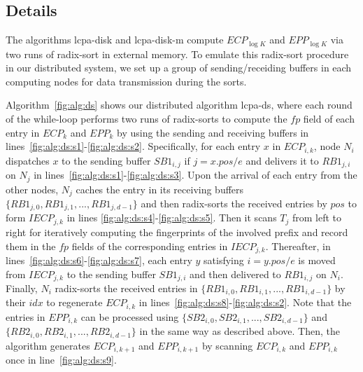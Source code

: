 \documentclass[10pt,journal,letterpaper,compsoc]{IEEEtran}
\begin{document}
\begin{CJK*}{GBK}{song}
\subsection{Details}

The algorithms lcpa-disk and lcpa-disk-m compute $ECP_{\log K}$ and $EPP_{\log K}$ via two runs of radix-sort in external memory. To emulate this radix-sort procedure in our distributed system, we set up a group of sending/receiding buffers in each computing nodes for data transmission during the sorts.

Algorithm~\ref{fig:alg:ds} shows our distributed algorithm lcpa-ds, where each round of the while-loop performs two runs of radix-sorts to compute the $fp$ field of each entry in $ECP_k$ and $EPP_k$ by using the sending and receiving buffers in lines~\ref{fig:alg:ds:s1}-\ref{fig:alg:ds:s2}. Specifically, for each entry $x$ in $ECP_{i,k}$, node $N_i$ dispatches $x$ to the sending buffer $SB1_{i,j}$ if $j = x.pos / e$ and delivers it to $RB1_{j,i}$ on $N_j$ in lines~\ref{fig:alg:ds:s1}-\ref{fig:alg:ds:s3}. Upon the arrival of each entry from the other nodes, $N_j$ caches the entry in its receiving buffers $\{RB1_{j,0},RB1_{j,1},...,RB1_{j,d-1}\}$ and then radix-sorts the received entries by $pos$ to form $IECP_{j,k}$ in lines \ref{fig:alg:ds:s4}-\ref{fig:alg:ds:s5}. Then it scans $T_j$ from left to right for iteratively computing the fingerprints of the involved prefix and record them in the $fp$ fields of the corresponding entries in $IECP_{j,k}$. Thereafter, in lines~\ref{fig:alg:ds:s6}-\ref{fig:alg:ds:s7}, each entry $y$ satisfying $i = y.pos /e$ is moved from $IECP_{j,k}$ to the sending buffer $SB1_{j,i}$ and then delivered to $RB1_{i,j}$ on $N_i$. Finally, $N_i$ radix-sorts the received entries in $\{RB1_{i,0},RB1_{i,1},...,RB1_{i,d-1}\}$ by their $idx$ to regenerate $ECP_{i,k}$ in lines~\ref{fig:alg:ds:s8}-\ref{fig:alg:ds:s2}. Note that the entries in $EPP_{i,k}$ can be processed using $\{SB2_{i,0}, SB2_{i,1},...,SB2_{i,d-1}\}$ and $\{RB2_{i,0}, RB2_{i,1}, ...,RB2_{i,d-1}\}$ in the same way as described above. Then, the algorithm generates $ECP_{i,k+1}$ and $EPP_{i,k+1}$ by scanning $ECP_{i,k}$ and $EPP_{i,k}$ once in line~\ref{fig:alg:ds:s9}.



\end{CJK*}
\end{document}

